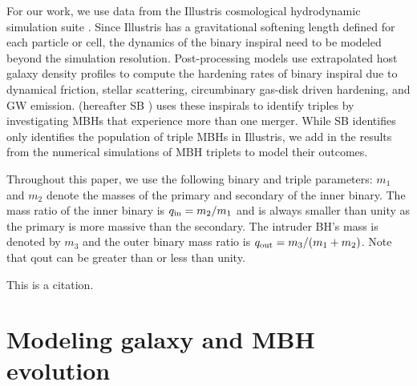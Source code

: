 \documentclass{book}
\begin{document}
For our work, we use data from the Illustris cosmological hydrodynamic simulation suite \citep{Vogelsberger_2013,Genel_2014,Nelson_2015}. Since Illustris has a gravitational softening length defined for each particle or cell, the dynamics of the binary inspiral need to be modeled beyond the simulation resolution. Post-processing models \citet{Kelley_2017a, Kelley_2017b,sayeb_massive_2021} use extrapolated host galaxy density profiles to compute the hardening rates of binary inspiral due to dynamical friction, stellar scattering, circumbinary gas-disk driven hardening, and GW emission. \citet{sayeb_mbh_2023} (hereafter SB ) uses these inspirals to identify triples by investigating MBHs that experience more than one merger. While SB{}  identifies only identifies the population of triple MBHs in Illustris, we add in the results from the \citet{bonetti_post-newtonian_2016,bonetti_post-newtonian_2018} numerical simulations of MBH triplets to model their outcomes.

Throughout this paper, we use the following binary and triple parameters: $m_1$ and $m_2$ denote the masses of the primary and secondary of the inner binary. The mass ratio of the inner binary is $q_{\rm in} = m_2/m_1$ and is always smaller than unity as the primary is more massive than the secondary. The intruder BH's mass is denoted by $m_3$ and the outer binary mass ratio is $q_{\rm out} = m_3/(m_1 + m_2)$. Note that qout can be greater than or less than unity.  





This is a citation\cite{Eg}.

\newpage



\chapter{Modeling galaxy and MBH evolution}
\end{document}
